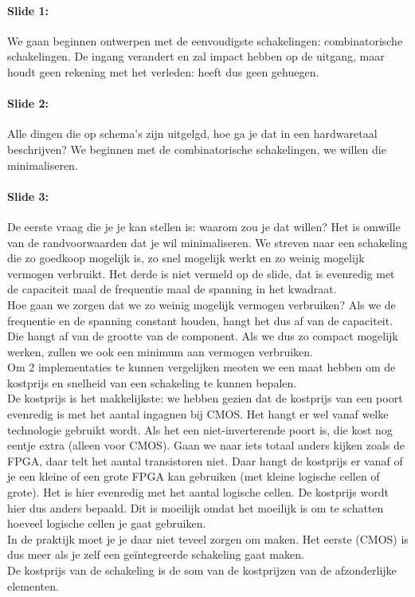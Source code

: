 \documentclass[10pt,a4paper]{book}
\begin{document}
\paragraph{Slide 1:} We gaan beginnen ontwerpen met de eenvoudigste schakelingen: combinatorische schakelingen. De ingang verandert en zal impact hebben op de uitgang, maar houdt geen rekening met het verleden: heeft dus geen gehuegen.

\paragraph{Slide 2:} Alle dingen die op schema's zijn uitgelgd, hoe ga je dat in een hardwaretaal beschrijven? We beginnen met de combinatorische schakelingen, we willen die minimaliseren.

\paragraph{Slide 3:} De eerste vraag die je je kan stellen is: waarom zou je dat willen? Het is omwille van de randvoorwaarden dat je wil minimaliseren. We streven naar een schakeling die zo goedkoop mogelijk is, zo snel mogelijk werkt en zo weinig mogelijk vermogen verbruikt. Het derde is niet vermeld op de slide, dat is evenredig met de capaciteit maal de frequentie maal de spanning in het kwadraat.\\
Hoe gaan we zorgen dat we zo weinig mogelijk vermogen verbruiken? Als we de frequentie en de spanning constant houden, hangt het dus af van de capaciteit. Die hangt af van de grootte van de component. Als we dus zo compact mogelijk werken, zullen we ook een minimum aan vermogen verbruiken.\\
Om 2 implementaties te kunnen vergelijken meoten we een maat hebben om de kostprijs en snelheid van een schakeling te kunnen bepalen.\\
De kostprijs is het makkelijkste: we hebben gezien dat de kostprijs van een poort evenredig is met het aantal ingagnen bij CMOS. Het hangt er wel vanaf welke technologie gebruikt wordt. Als het een niet-inverterende poort is, die kost nog eentje extra (alleen voor CMOS). Gaan we naar iets totaal anders kijken zoals de FPGA, daar telt het aantal transistoren niet. Daar hangt de kostprijs er vanaf of je een kleine of een grote FPGA kan gebruiken (met kleine logische cellen of grote). Het is hier evenredig met het aantal logische cellen. De kostprijs wordt hier dus anders bepaald. Dit is moeilijk omdat het moeilijk is om te schatten hoeveel logische cellen je gaat gebruiken.\\
In de praktijk moet je je daar niet teveel zorgen om maken. Het eerste (CMOS) is dus meer als je zelf een ge\"integreerde schakeling gaat maken.\\
De kostprijs van de schakeling is de som van de kostprijzen van de afzonderlijke elementen.
\end{document}
